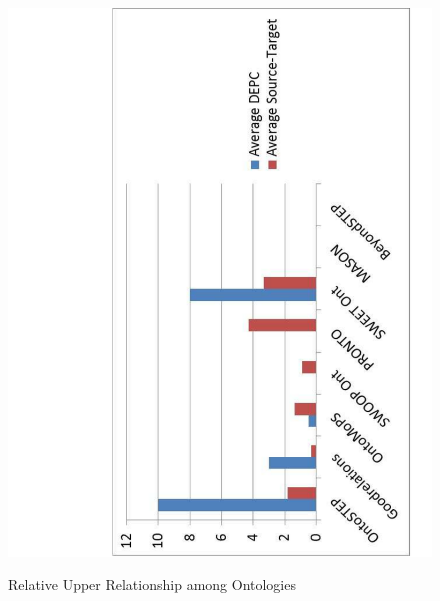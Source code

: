 \begin{figure}
	\begin{center}
		\includegraphics[scale=0.5, angle=-90]{figure-chapterIV/fig4-13.pdf}\\
		\caption{Relative Upper Relationship among Ontologies}
		\label{figure4-13}
	\end{center}
\end{figure}



